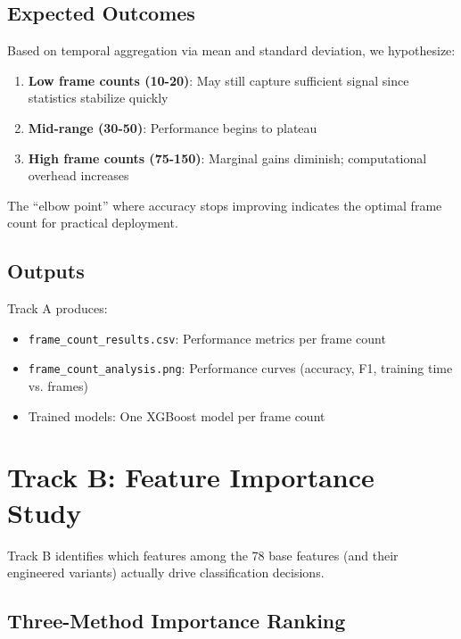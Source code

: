 \documentclass[11pt,a4paper]{article}
\begin{document}
\subsection{Expected Outcomes}

Based on temporal aggregation via mean and standard deviation, we hypothesize:

\begin{enumerate}
    \item \textbf{Low frame counts (10-20)}: May still capture sufficient signal since statistics stabilize quickly
    \item \textbf{Mid-range (30-50)}: Performance begins to plateau
    \item \textbf{High frame counts (75-150)}: Marginal gains diminish; computational overhead increases
\end{enumerate}

The ``elbow point'' where accuracy stops improving indicates the optimal frame count for practical deployment.

\subsection{Outputs}

Track A produces:
\begin{itemize}
    \item \texttt{frame\_count\_results.csv}: Performance metrics per frame count
    \item \texttt{frame\_count\_analysis.png}: Performance curves (accuracy, F1, training time vs. frames)
    \item Trained models: One XGBoost model per frame count
\end{itemize}

\section{Track B: Feature Importance Study}\label{sec:track-b}

Track B identifies which features among the 78 base features (and their engineered variants) actually drive classification decisions.

\subsection{Three-Method Importance Ranking}
\end{document}
